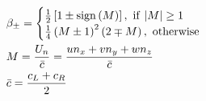 \documentclass[10pt]{article}
\begin{document}
\begin{align*}& \beta_{\pm} =
\begin{cases}
\frac{1}{2} \left[ 1 \pm {\rm sign} \left(M\right) \right], \ {\rm if} \ |M| \ge 1 \\
\frac{1}{4} \left( M \pm 1 \right)^2 \left( 2 \mp M \right), \ {\rm otherwise} 
\end{cases} \\
& M= \frac{U_{n}}{\bar{c}}=\frac{u n_x + v n_y + w n_z}{\bar{c}} \\
& \bar{c}= \frac{c_{L}+c_{R}}{2}\end{align*}
\end{document}
